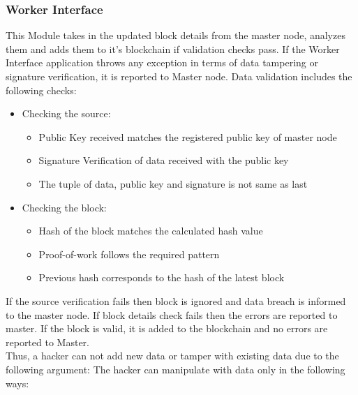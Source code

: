 \documentclass[AMA,STIX1COL]{WileyNJD-v2}
\begin{document}
\subsubsection{Worker Interface}
This Module takes in the updated block details from the master node, analyzes them and adds them to it's blockchain if validation checks pass. If the Worker Interface application throws any exception in terms of data tampering or signature verification, it is reported to Master node. Data validation includes the following checks:
\begin{itemize}
\item Checking the source:
\begin{itemize}
\item Public Key received matches the registered public key of master node
\item Signature Verification of data received with the public key
\item The tuple of data, public key and signature is not same as last
\end{itemize}
\item Checking the block:\
\begin{itemize}
\item Hash of the block matches the calculated hash value
\item Proof-of-work follows the required pattern
\item Previous hash corresponds to the hash of the latest block
\end{itemize}
\end{itemize}
If the source verification fails then block is ignored and data breach is informed to the master node. If block details check fails then the errors are reported to master. If the block is valid, it is added to the blockchain and no errors are reported to Master.\\
Thus, a hacker can not add new data or tamper with existing data due to the following argument:
The hacker can manipulate with data only in the following ways:
\end{document}
